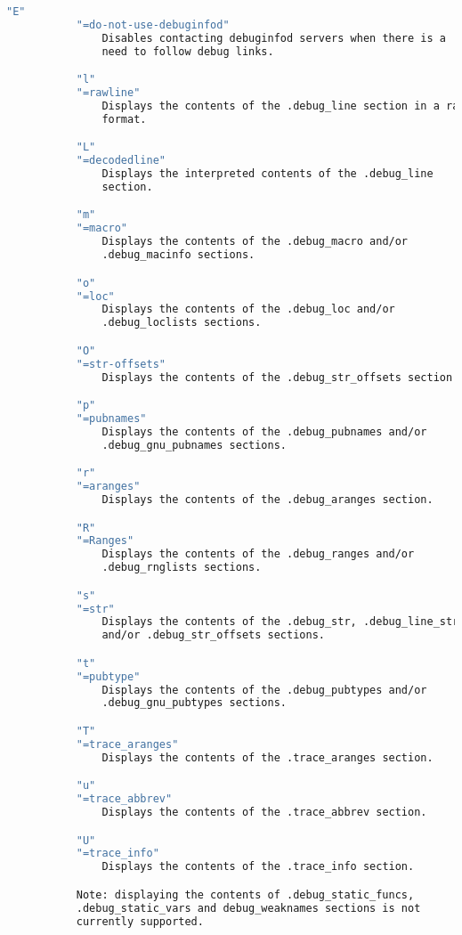 {{\begin{lstlisting}[language=bash]
           "E"
           "=do-not-use-debuginfod"
               Disables contacting debuginfod servers when there is a
               need to follow debug links.

           "l"
           "=rawline"
               Displays the contents of the .debug_line section in a raw
               format.

           "L"
           "=decodedline"
               Displays the interpreted contents of the .debug_line
               section.

           "m"
           "=macro"
               Displays the contents of the .debug_macro and/or
               .debug_macinfo sections.

           "o"
           "=loc"
               Displays the contents of the .debug_loc and/or
               .debug_loclists sections.

           "O"
           "=str-offsets"
               Displays the contents of the .debug_str_offsets section.

           "p"
           "=pubnames"
               Displays the contents of the .debug_pubnames and/or
               .debug_gnu_pubnames sections.

           "r"
           "=aranges"
               Displays the contents of the .debug_aranges section.

           "R"
           "=Ranges"
               Displays the contents of the .debug_ranges and/or
               .debug_rnglists sections.

           "s"
           "=str"
               Displays the contents of the .debug_str, .debug_line_str
               and/or .debug_str_offsets sections.

           "t"
           "=pubtype"
               Displays the contents of the .debug_pubtypes and/or
               .debug_gnu_pubtypes sections.

           "T"
           "=trace_aranges"
               Displays the contents of the .trace_aranges section.

           "u"
           "=trace_abbrev"
               Displays the contents of the .trace_abbrev section.

           "U"
           "=trace_info"
               Displays the contents of the .trace_info section.

           Note: displaying the contents of .debug_static_funcs,
           .debug_static_vars and debug_weaknames sections is not
           currently supported.


\end{lstlisting}}}
